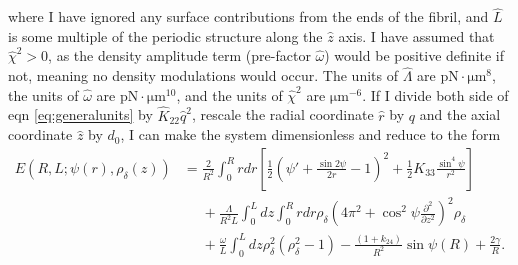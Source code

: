 \documentclass[12pt]{article}
\begin{document}
where I have ignored any surface contributions from the ends of the fibril, and $\hat{L}$ is some multiple of the periodic structure along the $\hat{z}$ axis. I have assumed that $\hat{\chi}^2>0$, as the density amplitude term (pre-factor $\hat{\omega}$) would be positive definite if not, meaning no density modulations would occur. The units of $\hat{\Lambda}$ are $\si{\pico\newton\cdot\micro\meter^8}$, the units of $\hat{\omega}$ are $\si{\pico\newton\cdot\micro\meter^{10}}$, and the units of $\hat{\chi}^2$ are $\si{\micro\meter^{-6}}$. If I divide both side of eqn \ref{eq:generalunits} by $\hat{K}_{22}\hat{q}^2$, rescale the radial coordinate $\hat{r}$ by $q$ and the axial coordinate $\hat{z}$ by $d_0$, I can make the system dimensionless and reduce to the form
\begin{align}\label{eq:general}
E(R,L;\psi(r),\rho_{\delta}(z))&=\frac{2}{R^2}\int_0^{R}rdr\left[\frac{1}{2}\left(\psi'+\frac{\sin2\psi}{2r}-1\right)^2+\frac{1}{2}K_{33}\frac{\sin^4\psi}{r^2}\right]\nonumber\\
&\phantom{=}+\frac{\Lambda}{R^2L}\int_0^{L}dz\int_0^{R}rdr\rho_{\delta}\left(4\pi^2+\cos^2\psi\frac{\partial^2}{\partial z^2}\right)^2\rho_{\delta}\nonumber\\
&\phantom{=}+\frac{\omega}{L}\int_0^{L}dz\rho_{\delta}^2\left(\rho_{\delta}^2-1\right)-\frac{(1+k_{24})}{R^2}\sin\psi(R)+\frac{2\gamma}{R}.
\end{align}
\end{document}
